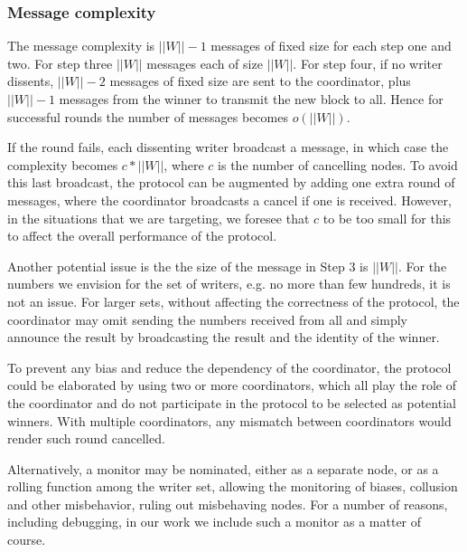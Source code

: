 \documentclass[10pt]{article}
\begin{document}
\subsubsection*{Message complexity}


The message complexity is $||W||-1$ messages of fixed size for each step one and two. For step three $||W||$ messages each of size $||W||$. For step four, if no writer dissents,  $||W||-2$ messages of fixed size are sent to the coordinator, 
plus $||W||-1$ messages from the winner to transmit the new block to all. 
Hence for successful rounds the number of messages becomes $o(||W||)$.

If the round fails, each dissenting writer broadcast a message, in which case the complexity becomes $c * ||W||$, where $c$ is the number of cancelling nodes.  To avoid this last broadcast, the protocol can be augmented by adding one extra round of messages, where the coordinator broadcasts a cancel if one is received. However, in the situations that we are targeting, we foresee that $c$ to be too small for this to affect the overall performance of the protocol. 

Another potential issue is the the size of the message in Step 3 is $||W||$. For the numbers we envision for the set of writers, e.g. no more than few hundreds, it is not an issue. For larger sets, without affecting the correctness of the protocol, the coordinator may omit sending the numbers received from all and simply announce the result by broadcasting the result and the identity of the winner.

To prevent any bias and reduce the dependency of the coordinator, the protocol could be elaborated by using two or more coordinators, which all play the role of the coordinator and do not participate in the protocol to be selected as potential winners. With multiple coordinators, any mismatch between coordinators would render such round cancelled.

Alternatively, a monitor may be nominated, either as a separate node, or as a rolling function among the writer set, allowing the monitoring of biases, collusion and other misbehavior, ruling out misbehaving nodes. For a number of reasons, including debugging, in our work we include such a monitor as a matter of course.

\end{document}
